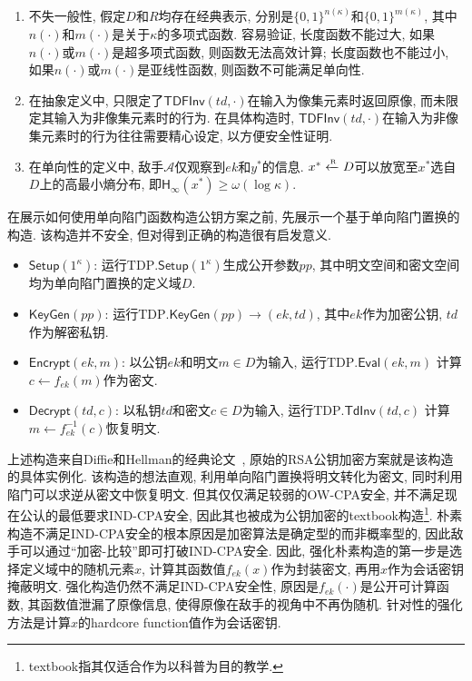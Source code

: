 \begin{remark}
\begin{enumerate}
\item 不失一般性, 假定$D$和$R$均存在经典表示, 分别是$\{0,1\}^{n(\kappa)}$和$\{0,1\}^{m(\kappa)}$, 
	其中$n(\cdot)$和$m(\cdot)$是关于$\kappa$的多项式函数. 
	容易验证, 长度函数不能过大, 如果$n(\cdot)$或$m(\cdot)$是超多项式函数, 则函数无法高效计算; 
	长度函数也不能过小, 如果$n(\cdot)$或$m(\cdot)$是亚线性函数, 则函数不可能满足单向性. 

\item 在抽象定义中, 只限定了$\mathsf{TDFInv}(td, \cdot)$在输入为像集元素时返回原像, 而未限定其输入为非像集元素时的行为. 
	在具体构造时, $\mathsf{TDFInv}(td, \cdot)$在输入为非像集元素时的行为往往需要精心设定, 以方便安全性证明. 

\item 在单向性的定义中, 敌手$\mathcal{A}$仅观察到$ek$和$y^*$的信息. 
	$x^* \xleftarrow{\textup{\tiny R}} D$可以放宽至$x^*$选自$D$上的高最小熵分布, 即$\mathsf{H}_{\infty}(x^*) \geq \omega(\log \kappa)$.
\end{enumerate}
\end{remark}

在展示如何使用单向陷门函数构造公钥方案之前, 先展示一个基于单向陷门置换的构造. 该构造并不安全, 但对得到正确的构造很有启发意义. 

\begin{construction}
\begin{itemize}
\item $\mathsf{Setup}(1^\kappa)$: 运行$\text{TDP}.\mathsf{Setup}(1^\kappa)$生成公开参数$pp$, 
	其中明文空间和密文空间均为单向陷门置换的定义域$D$. 

\item $\mathsf{KeyGen}(pp)$: 运行$\text{TDP}.\mathsf{KeyGen}(pp) \rightarrow (ek, td)$, 
	其中$ek$作为加密公钥, $td$作为解密私钥. 

\item $\mathsf{Encrypt}(ek, m)$: 以公钥$ek$和明文$m \in D$为输入, 运行$\text{TDP}.\mathsf{Eval}(ek, m)$
	计算$c \leftarrow f_{ek}(m)$作为密文.  

\item $\mathsf{Decrypt}(td, c)$: 以私钥$td$和密文$c \in D$为输入, 运行$\text{TDP}.\mathsf{TdInv}(td, c)$
	计算$m \leftarrow f_{ek}^{-1}(c)$恢复明文. 
\end{itemize}
\end{construction}

上述构造来自Diffie和Hellman的经典论文~\cite{DH-IEEE-IT-1976}, 原始的RSA公钥加密方案就是该构造的具体实例化. 
该构造的想法直观, 利用单向陷门置换将明文转化为密文, 同时利用陷门可以求逆从密文中恢复明文. 
但其仅仅满足较弱的OW-CPA安全, 并不满足现在公认的最低要求IND-CPA安全, 
因此其也被成为公钥加密的textbook构造\footnote{textbook指其仅适合作为以科普为目的教学.}.
朴素构造不满足IND-CPA安全的根本原因是加密算法是确定型的而非概率型的, 因此敌手可以通过``加密-比较''即可打破IND-CPA安全. 
因此, 强化朴素构造的第一步是选择定义域中的随机元素$x$, 计算其函数值$f_{ek}(x)$作为封装密文, 再用$x$作为会话密钥掩蔽明文. 
强化构造仍然不满足IND-CPA安全性, 原因是$f_{ek}(\cdot)$是公开可计算函数, 其函数值泄漏了原像信息, 使得原像在敌手的视角中不再伪随机. 
针对性的强化方法是计算$x$的hardcore function值作为会话密钥. 

